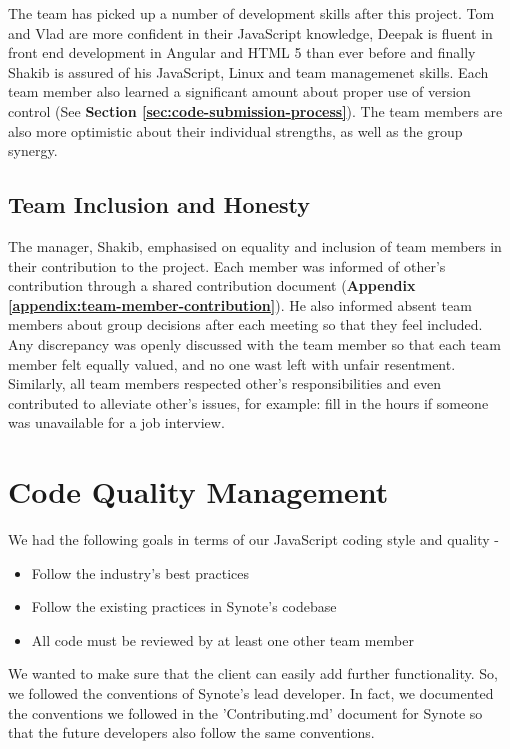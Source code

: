 The team has picked up a number of development skills after this project. Tom and Vlad are more confident in their JavaScript knowledge, Deepak is fluent in front end development in Angular and HTML 5 than ever before and finally Shakib is assured of his JavaScript, Linux and team managemenet skills. Each team member also learned a significant amount about proper use of version control (See \textbf{Section \ref{sec:code-submission-process}}). The team members are also more optimistic about their individual strengths, as well as the group synergy.

\subsection{Team Inclusion and Honesty}
\label{subsec:team-inclusion}
The manager, Shakib, emphasised on equality and inclusion of team members in their contribution to the project. Each member was informed of other's contribution through a shared contribution document (\textbf{Appendix \ref{appendix:team-member-contribution}}). He also informed absent team members about group decisions after each meeting so that they feel included. Any discrepancy was openly discussed with the team member so that each team member felt equally valued, and no one wast left with unfair resentment.\\

Similarly, all team members respected other's responsibilities and even contributed to alleviate other's issues, for example: fill in the hours if someone was unavailable for a job interview.

\section{Code Quality Management}
\label{sec:code-quality-management}

We had the following goals in terms of our JavaScript coding style and quality -

\begin{itemize}

  \item Follow the industry's best practices
  \item Follow the existing practices in Synote's codebase
  \item All code must be reviewed by at least one other team member

\end{itemize}

We wanted to make sure that the client can easily add further functionality. So, we followed the conventions of Synote's lead developer. In fact, we documented the conventions we followed in the 'Contributing.md' document for Synote so that the future developers also follow the same conventions.\\

